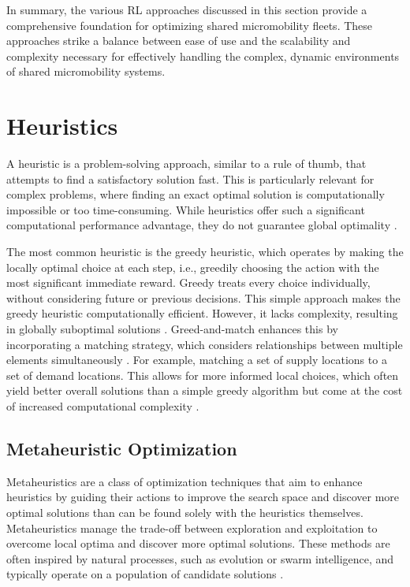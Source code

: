 In summary, the various RL approaches discussed in this section provide a comprehensive foundation for optimizing shared micromobility fleets.
These approaches strike a balance between ease of use and the scalability and complexity necessary for effectively handling the complex, dynamic environments of shared micromobility systems.


\section{Heuristics}\label{sec:background-heuristics}
A heuristic is a problem-solving approach, similar to a rule of thumb, that attempts to find a satisfactory solution fast.
This is particularly relevant for complex problems, where finding an exact optimal solution is computationally impossible or too time-consuming.
While heuristics offer such a significant computational performance advantage, they do not guarantee global optimality \cite{russell_modern_1995}. 

The most common heuristic is the greedy heuristic, which operates by making the locally optimal choice at each step, i.e., greedily choosing the action with the most significant immediate reward.
Greedy treats every choice individually, without considering future or previous decisions.
This simple approach makes the greedy heuristic computationally efficient.
However, it lacks complexity, resulting in globally suboptimal solutions \cite{russell_modern_1995}.
Greed-and-match enhances this by incorporating a matching strategy, which considers relationships between multiple elements simultaneously \cite{wu_challenges_2020}.
For example, matching a set of supply locations to a set of demand locations.
This allows for more informed local choices, which often yield better overall solutions than a simple greedy algorithm but come at the cost of increased computational complexity \cite{wu_challenges_2020}.

\subsection{Metaheuristic Optimization}
Metaheuristics are a class of optimization techniques that aim to enhance heuristics by guiding their actions to improve the search space and discover more optimal solutions than can be found solely with the heuristics themselves.
Metaheuristics manage the trade-off between exploration and exploitation to overcome local optima and discover more optimal solutions.
These methods are often inspired by natural processes, such as evolution or swarm intelligence, and typically operate on a population of candidate solutions \cite{russell_modern_1995}.

